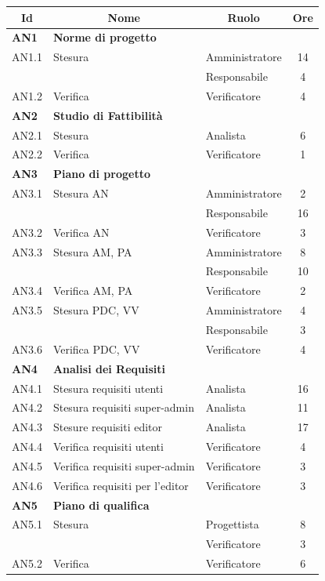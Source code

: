 \begin{table}[H]
	\centering
	\begin{tabular*}{1\textwidth}{ @{\extracolsep{\fill} } l l l c  }
	\hline
	\multicolumn{1}{c}{\textbf{Id}} & 
	\multicolumn{1}{c}{\textbf{Nome}} & 
	\multicolumn{1}{c}{\textbf{Ruolo}}& 
	\multicolumn{1}{c}{\textbf{Ore}} \\
	\hline
	
	\textbf{AN1} & \textbf{Norme di progetto} \\
	\cline{3-4}
	AN1.1 & Stesura & Amministratore & 14\\ 
    & & Responsabile & 4 \\
    \cline{3-4}
	AN1.2 & Verifica & Verificatore & 4\\
	
	\hline
	\textbf{AN2} & \textbf{Studio di Fattibilità} \\
	\cline{3-4}
	AN2.1 & Stesura & Analista & 6\\ 
    \cline{3-4}
	AN2.2 & Verifica & Verificatore &  1\\
	
	\hline
	\textbf{AN3} & \textbf{Piano di progetto} \\
	\cline{3-4}
	AN3.1 & Stesura AN & Amministratore & 2\\ 
    & & Responsabile & 16\\
    \cline{3-4}
	AN3.2 & Verifica AN & Verificatore & 3\\
	\cline{3-4}
	AN3.3 & Stesura AM, PA & Amministratore & 8\\ 
    & & Responsabile & 10\\
	\cline{3-4}
	AN3.4 & Verifica AM, PA & Verificatore & 2\\
	\cline{3-4}
	AN3.5 & Stesura PDC, VV & Amministratore & 4\\ 
        & & Responsabile & 3\\
	\cline{3-4}
	AN3.6 & Verifica PDC, VV & Verificatore & 4\\
	

	\hline
	\textbf{AN4} & \textbf{Analisi dei Requisiti} \\
	\cline{3-4}
	AN4.1 & Stesura requisiti utenti & Analista & 16\\ 
    \cline{3-4}
	AN4.2 & Stesura requisiti super-admin & Analista &  11\\
	\cline{3-4}
	AN4.3 & Stesure requisiti editor & Analista & 17\\ 
	\cline{3-4}
	AN4.4 & Verifica requisiti utenti & Verificatore &  4\\
        \cline{3-4}
        AN4.5 & Verifica requisiti super-admin & Verificatore &  3\\
        \cline{3-4}
        AN4.6 & Verifica requisiti per l'editor & Verificatore &  3\\
        \hline
        \textbf{AN5} & \textbf{Piano di qualifica} \\
	\cline{3-4}
	AN5.1 & Stesura & Progettista & 8\\
        & & Verificatore & 3\\
        \cline{3-4}
	AN5.2 & Verifica & Verificatore & 6\\


\end{tabular*}
\end{table}
